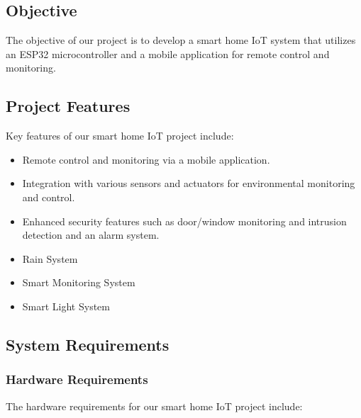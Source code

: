 \subsection{Objective}
The objective of our project is to develop a smart home IoT system that utilizes an ESP32 microcontroller and a mobile application for remote control and monitoring. 

\subsection{Project Features}
Key features of our smart home IoT project include:
\begin{itemize}
    \item Remote control and monitoring via a mobile application.
    \item Integration with various sensors and actuators for environmental monitoring and control.
    \item Enhanced security features such as door/window monitoring and intrusion detection and an alarm system.
    \item Rain System
    \item Smart Monitoring System
    \item Smart Light System
\end{itemize}

\subsection{System Requirements}
\subsubsection{Hardware Requirements}
The hardware requirements for our smart home IoT project include:

